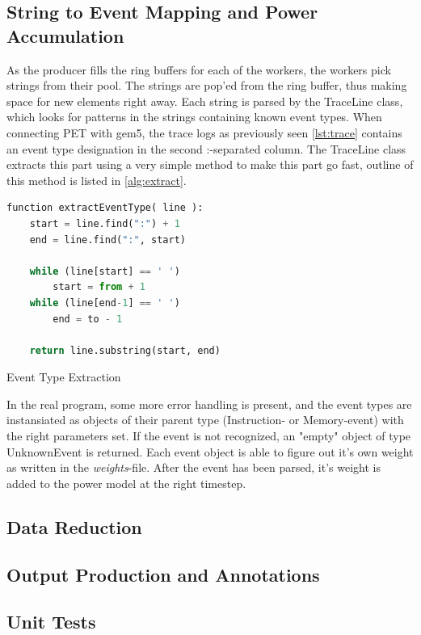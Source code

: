 \subsection{String to Event Mapping and Power Accumulation}

As the producer fills the ring buffers for each of the workers, the workers pick
strings from their pool. The strings are pop'ed from the ring buffer, thus making space
for new elements right away. Each string is parsed by the TraceLine class, which looks
for patterns in the strings containing known event types. When connecting PET with gem5,
the trace logs as previously seen \autoref{lst:trace} contains an event type designation
in the second :-separated column. The TraceLine class extracts this part using a very simple
method to make this part go fast, outline of this method is listed in \autoref{alg:extract}.

\begin{algorithm}
    \begin{lstlisting}[style=algo,language=python]
function extractEventType( line ):
    start = line.find(":") + 1
    end = line.find(":", start)

    while (line[start] == ' ')
        start = from + 1
    while (line[end-1] == ' ')
        end = to - 1

    return line.substring(start, end)
    \end{lstlisting}
    \caption{Event Type Extraction}
    \label{alg:extract}
\end{algorithm}

In the real program, some more error handling is present, and the event types are instansiated as
objects of their parent type (Instruction- or Memory-event) with the right parameters set. If
the event is not recognized, an "empty" object of type UnknownEvent is returned. Each
event object is able to figure out it's own weight as written in the \emph{weights}-file. After
the event has been parsed, it's weight is added to the power model at the right timestep.

\subsection{Data Reduction}


\subsection{Output Production and Annotations}

\subsection{Unit Tests}


